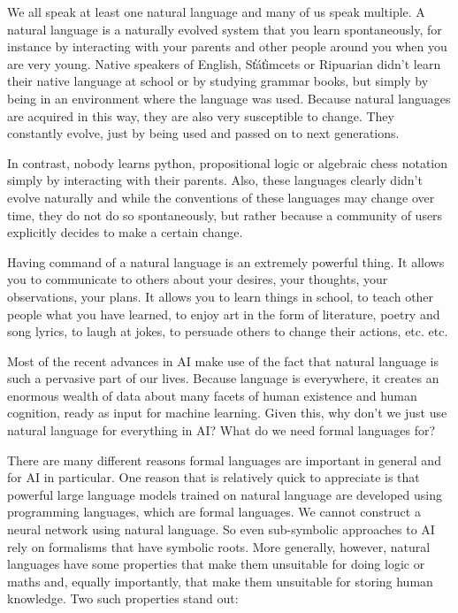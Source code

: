 \documentclass[11pt]{article}
\begin{document}
We all speak at least one natural language and many of us speak multiple. A natural language is a naturally evolved system that you learn spontaneously, for instance by interacting with your parents and other people around you when you are very young. Native speakers of English, St̓át̓imcets or Ripuarian didn't learn their native language at school or by studying grammar books, but simply by being in an environment where the language was used. Because natural languages are acquired in this way, they are also very susceptible to change. They constantly evolve, just by being used and passed on to next generations. 

In contrast, nobody learns python, propositional logic or algebraic chess notation simply by interacting with their parents. Also, these languages clearly didn't evolve naturally and while the conventions of these languages may change over time, they do not do so spontaneously, but rather because a community of users explicitly decides to make a certain change.  

Having command of a natural language is an extremely powerful thing. It allows you to communicate to others about your desires, your thoughts, your observations, your plans. It allows you to learn things in school, to teach other people what you have learned, to enjoy art in the form of literature, poetry and song lyrics, to laugh at jokes, to persuade others to change their actions, etc. etc. 

Most of the recent advances in AI make use of the fact that natural language is such a pervasive part of our lives. Because language is everywhere, it creates an enormous wealth of data about many facets of human existence and human cognition, ready as input for machine learning. Given this, why don't we just use natural language for everything in AI? What do we need formal languages for?

There are many different reasons formal languages are important in general and for AI in particular. One reason that is relatively quick to appreciate is that powerful large language models trained on natural language are developed using programming languages, which are formal languages. We cannot construct a neural network using natural language. So even sub-symbolic approaches to AI rely on formalisms that have symbolic roots. More generally, however, natural languages have some properties that make them unsuitable for doing logic or maths and, equally importantly, that make them unsuitable for storing human knowledge. Two such properties stand out:
\end{document}
